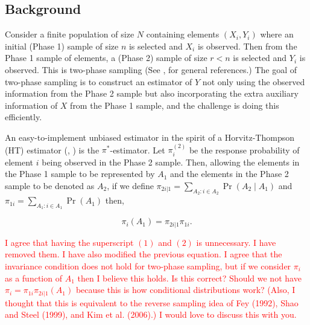 \documentclass[12pt]{article}
\begin{document}
\subsection{Background}

Consider a finite population of size $N$ containing elements $(X_i, Y_i)$ where
an initial (Phase 1) sample of size $n$ is selected and $X_i$ is observed. Then
from the Phase 1 sample of elements, a (Phase 2) sample of size $r < n$ is
selected and $Y_i$ is observed. This is two-phase sampling (See 
\cite{fuller2009sampling}, \cite{kim2024statistics} for general references.) The
goal of two-phase sampling is to construct an estimator of $Y$ not
only using the observed information from the Phase 2 sample but also
incorporating the extra auxiliary information of $X$ from the Phase 1 sample, and
the challenge is doing this efficiently.

An easy-to-implement unbiased estimator in the spirit of a Horvitz-Thompson (HT)
estimator (\cite{horvitz1952generalization}, \cite{narain1951sampling}) is the
$\pi^*$-estimator. Let $\pi_i^{(2)}$ be the response probability of element $i$
being observed in the Phase 2 sample. Then, allowing the elements in the Phase 1
sample to be represented by $A_1$ and the elements in the Phase 2 sample to be
denoted as $A_2$,
if we define $\pi_{2i | 1} = \sum_{A_2: i \in A_2} \Pr(A_2 \mid A_1)$ and
$\pi_{1i} = \sum_{A_1: i \in A_1} \Pr(A_1)$ then,

$$ \pi_i(A_1) = \pi_{2i | 1} \pi_{1i}.$$

\textcolor{red}{I agree that having the superscript $(1)$ and $(2)$ is
  unnecessary. I have removed them. I have also modified the previous equation.
  I agree that the invariance condition does not hold for two-phase sampling,
  but if we consider $\pi_i$ as a function of $A_1$ then I believe this holds.
  Is this correct? Should we not have $\pi_{i} = \pi_{1i} \pi_{2i|1}(A_1)$
  because this is how conditional distributions work? (Also, I thought that this
  is equivalent to the reverse sampling idea of Fey (1992), Shao and Steel
(1999), and Kim et al. (2006).) I would love to discuss this with you.}
\end{document}
